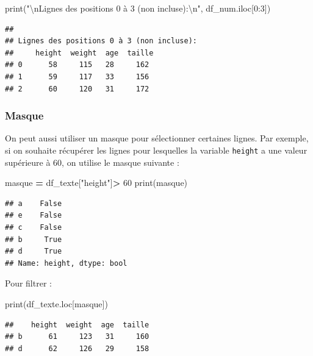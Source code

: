 \documentclass[
  12pt,
]{book}
\newenvironment{Shaded}{\begin{snugshade}}{\end{snugshade}}
\newcommand{\BuiltInTok}[1]{#1}
\newcommand{\CharTok}[1]{\textcolor[rgb]{0.31,0.60,0.02}{#1}}
\newcommand{\DecValTok}[1]{\textcolor[rgb]{0.00,0.00,0.81}{#1}}
\newcommand{\NormalTok}[1]{#1}
\newcommand{\OperatorTok}[1]{\textcolor[rgb]{0.81,0.36,0.00}{\textbf{#1}}}
\newcommand{\StringTok}[1]{\textcolor[rgb]{0.31,0.60,0.02}{#1}}
\numberwithin{equation}{section}
\numberwithin{countremarque}{section}
\begin{document}
\begin{Shaded}
\begin{Highlighting}[]
\BuiltInTok{print}\NormalTok{(}\StringTok{"}\CharTok{\textbackslash{}n}\StringTok{Lignes des positions 0 à 3 (non incluse):}\CharTok{\textbackslash{}n}\StringTok{"}\NormalTok{, df\_num.iloc[}\DecValTok{0}\NormalTok{:}\DecValTok{3}\NormalTok{])}
\end{Highlighting}
\end{Shaded}

\begin{lstlisting}
## 
## Lignes des positions 0 à 3 (non incluse):
##     height  weight  age  taille
## 0      58     115   28     162
## 1      59     117   33     156
## 2      60     120   31     172
\end{lstlisting}

\subsubsection{Masque}\label{masque-extraction-ligne}

On peut aussi utiliser un masque pour sélectionner certaines lignes. Par exemple, si on souhaite récupérer les lignes pour lesquelles la variable \texttt{height} a une valeur supérieure à 60, on utilise le masque suivante :

\begin{Shaded}
\begin{Highlighting}[]
\NormalTok{masque }\OperatorTok{=}\NormalTok{ df\_texte[}\StringTok{"height"}\NormalTok{]}\OperatorTok{\textgreater{}} \DecValTok{60}
\BuiltInTok{print}\NormalTok{(masque)}
\end{Highlighting}
\end{Shaded}

\begin{lstlisting}
## a    False
## e    False
## c    False
## b     True
## d     True
## Name: height, dtype: bool
\end{lstlisting}

Pour filtrer :

\begin{Shaded}
\begin{Highlighting}[]
\BuiltInTok{print}\NormalTok{(df\_texte.loc[masque])}
\end{Highlighting}
\end{Shaded}

\begin{lstlisting}
##    height  weight  age  taille
## b      61     123   31     160
## d      62     126   29     158
\end{lstlisting}
\end{document}
